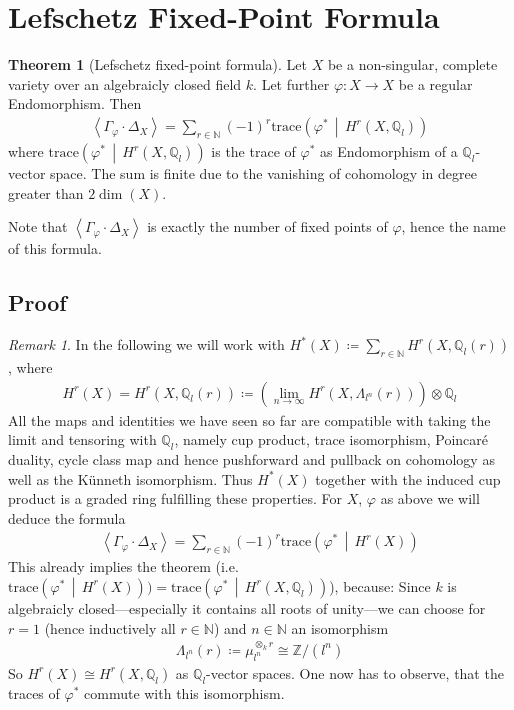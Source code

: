 \documentclass[english]{scrartcl}
\theoremstyle{definition}
\newtheorem{Thm}[Def]{Theorem}
\theoremstyle{remark}
\newtheorem{Rem}[Def]{Remark}
\newcommand*{\N}{\mathds{N}}
\newcommand*{\Z}{\mathds{Z}}
\newcommand*{\Q}{\mathds{Q}}
\newcommand*{\Zmod}[1]{\Z/#1} %
\newcommand*{\Zl}{\Z_l} %
\newcommand*{\Ql}{\Q_l} %
\newcommand*{\idest}{i.e.\ }
\newcommand*{\M}{\Lambda}
\newcommand*{\intProd}[2]{{#1\cdot#2}} %
\newcommand*{\intNum}[1]{{\left\langle{#1}\right\rangle}} %
\newcommand*{\Graph}[1]{{\Gamma_{#1}}} %
\newcommand*{\Diag}[1]{{\Delta_{#1}}} %
\newcommand*{\trace}[2]{{\text{trace}\left(#1 \,\middle|\, #2 \right)}} %
\renewcommand*{\phi}{\varphi}
\begin{document}
\section{Lefschetz Fixed-Point Formula}

\begin{Thm}[Lefschetz fixed-point formula]\label{lefschetzthm}
  Let $X$ be a non-singular, complete variety over an algebraicly
  closed field $k$.
  Let further $\phi\colon X\to X$ be a regular Endomorphism.
  Then
  \begin{gather*}
    \intNum{\intProd{\Graph{\phi}}{\Diag{X}}}
    = \sum_{r\in\N} (-1)^r \trace{\phi^*}{H^r(X,\Ql)}
  \end{gather*}
  where $\trace{\phi^*}{H^r(X,\Ql)}$ is the trace of $\phi^*$ as
  Endomorphism of a $\Ql$-vector space. 
  The sum is finite due to the vanishing
  of cohomology in degree greater than $2\dim(X)$. 
\end{Thm}
Note that $\intNum{\intProd{\Graph{\phi}}{\Diag{X}}}$ is exactly the number of
fixed points of $\phi$, hence the name of this formula.


\subsection{Proof}
\begin{Rem}
  In the following we will work with
  $H^*(X)\coloneqq\sum_{r\in\N} H^r(X, \Ql(r))$, where
  \begin{gather*}
    H^r(X) = H^r(X,\Ql(r)) \coloneqq
    \left(\lim_{n\to\infty} H^r(X,\M_{l^n}(r))\right) \otimes \Ql
  \end{gather*}
  All the maps and identities we have seen so far are compatible with
  taking the limit and tensoring with $\Ql$, namely
  cup product,
  trace isomorphism,
  Poincaré duality,
  cycle class map and hence
  pushforward and pullback on cohomology as well as
  the Künneth isomorphism.
  Thus $H^*(X)$ together with the induced cup product is a graded ring
  fulfilling these properties.
  For $X$, $\phi$ as above we will deduce the formula
  \begin{gather*}
    \intNum{\intProd{\Graph{\phi}}{\Diag{X}}}
    = \sum_{r\in\N} (-1)^r \trace{\phi^*}{H^r(X)}
  \end{gather*}
  This already implies the theorem
  (\idest $\trace{\phi^*}{H^r(X)})=\trace{\phi^*}{H^r(X,\Ql)}$),
  because:
  Since $k$ is algebraicly closed---especially it contains all
  roots of unity---we can choose for $r=1$ (hence inductively all
  $r\in\N$) and $n\in\N$ an isomorphism
  \begin{gather*}
    \M_{l^n}(r)\coloneqq\mu_{l^n}^{\otimes_k r} \cong \Zmod{(l^n)}
  \end{gather*}
  So $H^r(X)\cong H^r(X,\Ql)$ as $\Ql$-vector spaces.
  One now has to observe, that the traces of $\phi^*$ commute with
  this isomorphism.
\end{Rem} 
\end{document}
